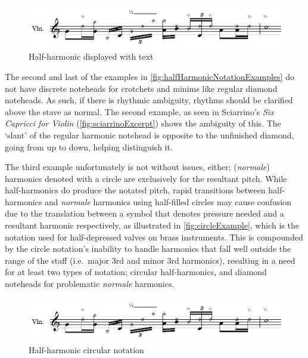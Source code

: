\begin{figure}
  \includegraphics[page=1,width=\textwidth]{resources/halfHarmonicsSingleExamples.pdf}
  \caption{Half-harmonic displayed with text}\label{fig:textSymbolNotation}
\end{figure}

The second and last of the examples in \autoref{fig:halfHarmonicNotationExamples} do not have discrete noteheads for crotchets and minims like regular diamond noteheads.
As such, if there is rhythmic ambiguity, rhythms should be clarified above the stave as normal.
The second example, as seen in Sciarrino's \emph{Six Capricci for Violin} (\autoref{fig:sciarrinoExcerpt}) shows the ambiguity of this.
The `slant' of the regular harmonic notehead is opposite to the unfinished diamond, going from up to down, helping distinguish it.

The third example unfortunately is not without issues, either; (\emph{normale}) harmonics denoted with a circle are exclusively for the resultant pitch.\autocite[419]{gouldBars2011} 
While half-harmonics do produce the notated pitch, rapid transitions between half-harmonics and \emph{normale} harmonics using half-filled circles may cause confusion due to the translation between a symbol that denotes pressure needed and a resultant harmonic respectively, as illustrated in \autoref{fig:circleExample}, which is the notation used for half-depressed valves on brass instruments.\autocite[85]{cherryExtendedTechniquesTrumpet2009}
This is compounded by the circle notation's inability to handle harmonics that fall well outside the range of the staff (i.e.\ major 3rd and minor 3rd harmonics), resulting in a need for at least two types of notation; circular half-harmonics, and diamond noteheads for problematic \emph{normale} harmonics.

\begin{figure}
    \includegraphics[page=3,width=\textwidth]{resources/halfHarmonicsSingleExamples.pdf}
    \caption{Half-harmonic circular notation}\label{fig:circleExample}
  \end{figure}

